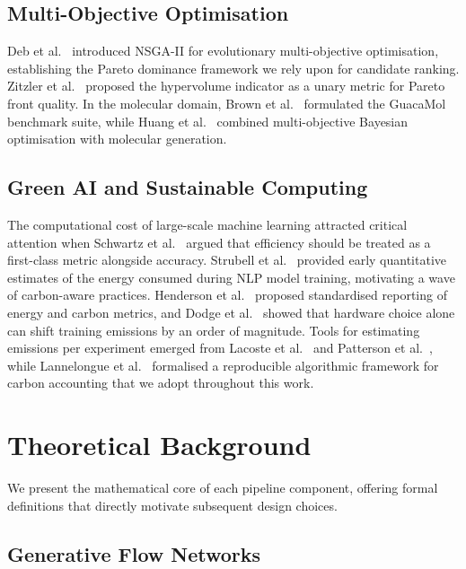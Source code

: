 \documentclass[twocolumn,10pt]{article}
\begin{document}
\subsection{Multi-Objective Optimisation}
Deb et al.~\cite{deb2002nsga} introduced NSGA-II for evolutionary multi-objective
optimisation, establishing the Pareto dominance framework we rely upon for candidate
ranking. Zitzler et al.~\cite{zitzler2003hypervolume} proposed the hypervolume indicator
as a unary metric for Pareto front quality. In the molecular domain, Brown et al.~\cite{brown2019guacamol}
formulated the GuacaMol benchmark suite, while Huang et al.~\cite{huang2021therapeutics}
combined multi-objective Bayesian optimisation with molecular generation.

\subsection{Green AI and Sustainable Computing}
The computational cost of large-scale machine learning attracted critical attention when
Schwartz et al.~\cite{schwartz2020green} argued that efficiency should be treated as a
first-class metric alongside accuracy. Strubell et al.~\cite{strubell2019energy} provided
early quantitative estimates of the energy consumed during NLP model training, motivating
a wave of carbon-aware practices. Henderson et al.~\cite{henderson2020towards} proposed
standardised reporting of energy and carbon metrics, and Dodge et al.~\cite{dodge2022measuring}
showed that hardware choice alone can shift training emissions by an order of magnitude.
Tools for estimating emissions per experiment emerged from
Lacoste et al.~\cite{lacoste2019quantifying} and Patterson et al.~\cite{patterson2021carbon},
while Lannelongue et al.~\cite{lannelongue2021green} formalised a reproducible algorithmic
framework for carbon accounting that we adopt throughout this work.

\section{Theoretical Background}

We present the mathematical core of each pipeline component, offering formal definitions
that directly motivate subsequent design choices.

\subsection{Generative Flow Networks}
\end{document}
